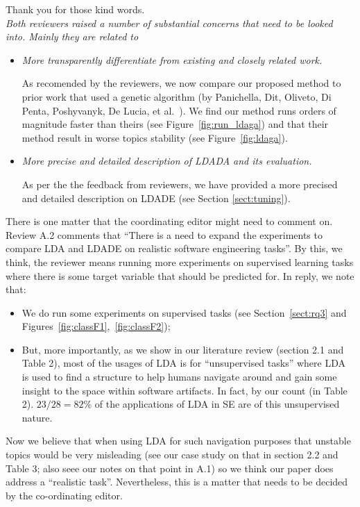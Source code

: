 \documentclass[twocolumn,5p,sort&compress]{elsarticle}
\newcommand{\bi}{\begin{itemize}}
\newcommand{\ei}{\end{itemize}}
\theoremstyle{break}
\begin{document}
Thank you for those kind words.\\

{\em Both reviewers raised a number of substantial concerns that need to be looked into. Mainly they are related to}

\bi
\item
{\em More transparently differentiate from existing and closely related work.}

As recomended by the reviewers, we now compare our proposed method to prior work
that used a genetic algorithm
(by Panichella, Dit, Oliveto,  Di Penta,  Poshyvanyk, De Lucia, et al.~\cite{panichella2013effectively}). We find our method runs
orders of magnitude faster than theirs (see Figure~\ref{fig:run_ldaga}) and
that their method result in worse topics stability  (see Figure~\ref{fig:ldaga}).\\


\item
{\em More precise and detailed description of LDADA and its evaluation.}

As per the the feedback from reviewers,   we have provided a more precised and detailed description on LDADE (see Section \ref{sect:tuning}).\\
\ei

There is one matter that the coordinating editor might need to comment on. Review A.2 comments that ``There is a need to expand the experiments to  compare  LDA  and  LDADE  on    realistic  software engineering  tasks''. By this, we think, the reviewer
means running more experiments on supervised learning tasks where there is some target variable that should be predicted for. In reply, we note that:
\bi
\item
We do run some experiments on supervised tasks (see Section~\ref{sect:rq3} and Figures~\ref{fig:classF1},~\ref{fig:classF2});
\item
But, more importantly, as we show in our
literature review (section 2.1 and Table 2), most of the usages of LDA is for ``unsupervised tasks'' where LDA is used to find a structure to help humans navigate around and  gain some insight to the space within software artifacts. In fact, by our count (in Table 2). $23/28=82$\% of the applications
of LDA in SE are of this unsupervised nature. 
\ei
Now we believe that when using LDA for such navigation purposes that unstable topics would be very misleading (see our case study on that in section 2.2 and Table 3; also seee our notes on that point in A.1) so we think our paper does address a ``realistic task''. Nevertheless, this
is a matter that needs to be decided by the co-ordinating editor.
\end{document}
